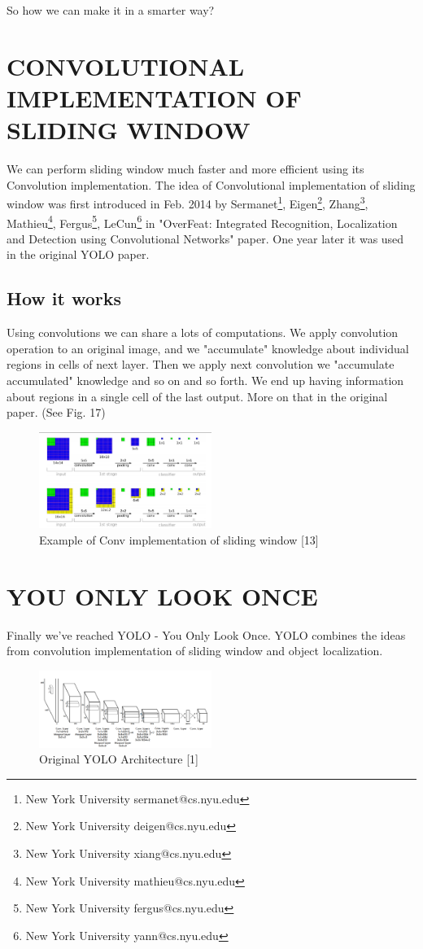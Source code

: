 \documentclass[letterpaper, 10 pt, conference]{ieeeconf}  %
\begin{document}
So how we can make it in a smarter way?


\section{CONVOLUTIONAL IMPLEMENTATION OF SLIDING WINDOW}
We can perform sliding window much faster and more efficient using its Convolution implementation. The idea of Convolutional implementation of sliding window was first introduced in Feb. 2014 by Sermanet\footnote{New York University sermanet@cs.nyu.edu},  Eigen\footnote{New York University deigen@cs.nyu.edu}, Zhang\footnote{New York University xiang@cs.nyu.edu}, Mathieu\footnote{New York University mathieu@cs.nyu.edu}, Fergus\footnote{New York University fergus@cs.nyu.edu}, LeCun\footnote{New York University yann@cs.nyu.edu}  in "OverFeat: Integrated Recognition, Localization and Detection using Convolutional Networks" paper. One year later it was used in the original YOLO paper. 

\subsection{How it works}
Using convolutions we can share a lots of computations. We apply convolution operation to an original image, and we "accumulate" knowledge about individual regions in cells of next layer. Then we apply next convolution we "accumulate accumulated" knowledge and so on and so forth. We end up having information about regions in a single cell of the last output. More on that in the original paper. (See Fig. 17) 

\begin{figure}[!ht]
	\centering
    \includegraphics[width=0.5\textwidth]{Pictures/Convlutional_sliding_window.png}
	\caption{Example of Conv implementation of sliding window [13]}
\end{figure}

\section{YOU ONLY LOOK ONCE}
Finally we've reached YOLO - You Only Look Once. YOLO combines the ideas from convolution implementation of sliding window and object localization.
\begin{figure}[!ht]
	\centering
    \includegraphics[width=0.5\textwidth]{Pictures/YOLO_architecture.png}
	\caption{Original YOLO Architecture [1]}
\end{figure}
\end{document}
